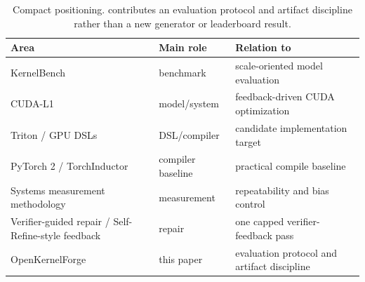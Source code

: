 \begin{table}[htbp]
\centering
\caption{Compact positioning. \okf{} contributes an evaluation protocol and artifact discipline rather than a new generator or leaderboard result.}
\label{tab:positioning}
\scriptsize
\begin{tabularx}{\linewidth}{l l X}
\toprule
Area & Main role & Relation to \okf{} \\
\midrule
KernelBench & benchmark & scale-oriented model evaluation \\
CUDA-L1 & model/system & feedback-driven CUDA optimization \\
Triton / GPU DSLs & DSL/compiler & candidate implementation target \\
PyTorch 2 / TorchInductor & compiler baseline & practical compile baseline \\
Systems measurement methodology & measurement & repeatability and bias control \\
Verifier-guided repair / Self-Refine-style feedback & repair & one capped verifier-feedback pass \\
OpenKernelForge & this paper & evaluation protocol and artifact discipline \\
\bottomrule
\end{tabularx}
\end{table}
